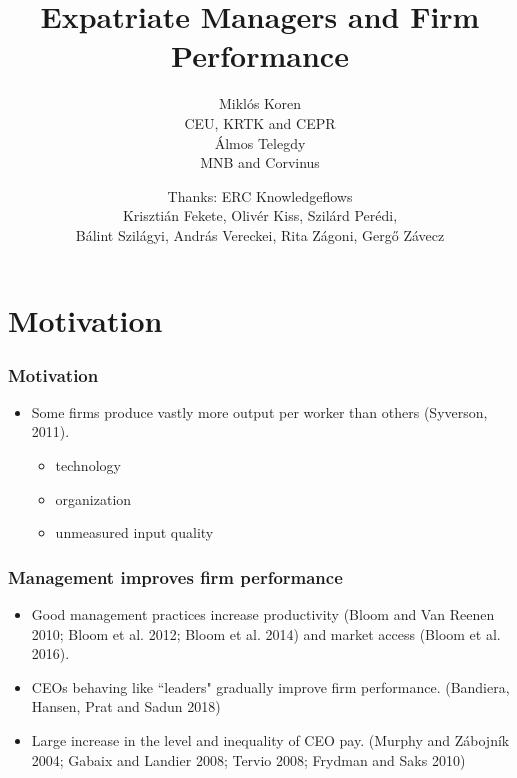 \documentclass[aspectratio=43,compress,mathserif]{beamer}
\title{Expatriate Managers and Firm Performance}
\author{Miklós Koren\\
CEU, KRTK and CEPR\\
Álmos Telegdy\\
MNB and Corvinus}
\date %
{Thanks: ERC Knowledgeflows\\Krisztián Fekete, Olivér Kiss, Szilárd Perédi,\\ Bálint Szilágyi, András Vereckei, Rita Zágoni, Gergő Závecz}
\begin{document}
\begin{frame}[plain]
  \titlepage
    \addtocounter{framenumber}{-1}
\end{frame}






\section{Motivation}\hypertarget{Motivation}{}
\begin{frame}\frametitle{Motivation}\hypertarget{Motivation}{}
\begin{itemize}
\item Some firms produce vastly more output per worker than others (Syverson, 2011).
\begin{itemize}
\item technology

\item organization

\item unmeasured input quality




\end{itemize}

\end{itemize}
\end{frame}



\begin{frame}\frametitle{Management improves firm performance}\hypertarget{Management improves firm performance}{}
\begin{itemize}
\item Good management practices  increase  productivity  (Bloom  and  Van  Reenen  2010;  Bloom  et  al.  2012;  Bloom  et  al.  2014) and market access (Bloom et al. 2016). 

\item CEOs behaving like ``leaders" gradually improve firm performance. (Bandiera, Hansen, Prat and Sadun 2018)

\item Large increase  in  the  level  and  inequality  of  CEO  pay.  (Murphy  and  Zábojník  2004;  Gabaix  and  Landier  2008;  Tervio  2008; Frydman and Saks 2010)


\end{itemize}
\end{frame}
\end{document}
